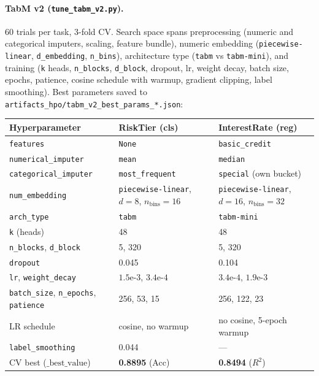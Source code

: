 \documentclass[11pt,a4paper]{article}
\begin{document}
\paragraph{TabM v2 (\texttt{tune\_tabm\_v2.py}).} 60 trials per task, 3-fold CV. Search space spans preprocessing (numeric and categorical imputers, scaling, feature bundle), numeric embedding (\texttt{piecewise-linear}, \texttt{d\_embedding}, \texttt{n\_bins}), architecture type (\texttt{tabm} vs \texttt{tabm-mini}), and training (\texttt{k} heads, \texttt{n\_blocks}, \texttt{d\_block}, dropout, lr, weight decay, batch size, epochs, patience, cosine schedule with warmup, gradient clipping, label smoothing). Best parameters saved to \texttt{artifacts\_hpo/tabm\_v2\_best\_params\_*.json}:

\begin{table}[h]
\centering
\small
\begin{tabularx}{\linewidth}{lXX}
\toprule
\textbf{Hyperparameter} & \textbf{RiskTier (cls)} & \textbf{InterestRate (reg)} \\
\midrule
\texttt{features} & \texttt{None} & \texttt{basic\_credit} \\
\texttt{numerical\_imputer} & \texttt{mean} & \texttt{median} \\
\texttt{categorical\_imputer} & \texttt{most\_frequent} & \texttt{special} (own bucket) \\
\texttt{num\_embedding} & \texttt{piecewise-linear}, $d{=}8$, $n_{\text{bins}}{=}16$ & \texttt{piecewise-linear}, $d{=}16$, $n_{\text{bins}}{=}32$ \\
\texttt{arch\_type} & \texttt{tabm} & \texttt{tabm-mini} \\
\texttt{k} (heads) & 48 & 48 \\
\texttt{n\_blocks}, \texttt{d\_block} & 5, 320 & 5, 320 \\
\texttt{dropout} & 0.045 & 0.104 \\
\texttt{lr}, \texttt{weight\_decay} & $1.5\text{e-}3$, $3.4\text{e-}4$ & $3.4\text{e-}4$, $1.9\text{e-}3$ \\
\texttt{batch\_size}, \texttt{n\_epochs}, \texttt{patience} & 256, 53, 15 & 256, 122, 23 \\
LR schedule & cosine, no warmup & no cosine, 5-epoch warmup \\
\texttt{label\_smoothing} & 0.044 & --- \\
CV best ($\text{\_best\_value}$) & \textbf{0.8895} (Acc) & \textbf{0.8494} ($R^2$) \\
\bottomrule
\end{tabularx}
\end{table}
\end{document}
